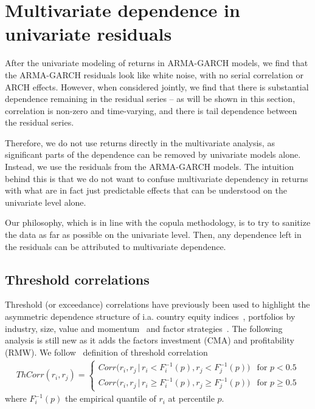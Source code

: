 \section{Multivariate dependence in univariate residuals} %
\label{sec:multivariate_dependence}
After the univariate modeling of returns in ARMA-GARCH models, we find that the ARMA-GARCH residuals look like white noise, with no serial correlation or ARCH effects. However, when considered jointly, we find that there is substantial dependence remaining in the residual series -- as will be shown in this section, correlation is non-zero and time-varying, and there is tail dependence between the residual series. 

Therefore, we do not use returns directly in the multivariate analysis, as significant parts of the dependence can be removed by univariate models alone. Instead, we use the residuals from the ARMA-GARCH models. The intuition behind this is that we do not want to confuse multivariate dependency in returns with what are in fact just predictable effects that can be understood on the univariate level alone.

Our philosophy, which is in line with the copula methodology, is to try to sanitize the data as far as possible on the univariate level. Then, any dependence left in the residuals can be attributed to multivariate dependence.

\subsection{Threshold correlations}
\label{subsec:threshold_corr}
Threshold (or exceedance) correlations have previously been used to highlight the asymmetric dependence structure of i.a. country equity indices~\autocite{LonginSolnik2001}, portfolios by industry, size, value and momentum~\autocite{AngChen2002} and factor strategies~\autocite{ChristoffersenLanglois2013}. The following analysis is still new as it adds the factors investment (CMA) and profitability (RMW). We follow~\textcite{ChristoffersenLanglois2013} definition of threshold correlation
\begin{align}
    ThCorr(r_i, r_j) = 
    \begin{cases} 
        Corr\Big(r_i, r_j \,|\, r_i < F_i^{-1}(p), r_j < F_j^{-1}(p)\Big)  & \text{for } p < 0.5 \\
        Corr\Big(r_i, r_j \,|\, r_i \geq F_i^{-1}(p), r_j \geq F_j^{-1}(p)\Big)  & \text{for } p \geq 0.5
    \end{cases}
\end{align}
where $F_i^{-1}(p)$ the empirical quantile of $r_i$ at percentile $p$. 

